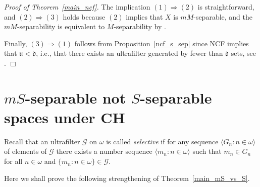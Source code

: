 \documentclass[12pt,a4paper]{amsart}
\theoremstyle{definition}
\newcommand{\w}{\omega}
\newcommand{\CG}{\mathcal{G}}
\newcommand{\la}{\langle}
\newcommand{\ra}{\rangle}
\newcommand{\hot}{\mathfrak}
\begin{document}
\noindent\textit{Proof of Theorem~\ref{main_ncf}.}
The implication 
$(1)\Rightarrow(2)$ is straightforward, and $(2)\Rightarrow (3)$ holds because $(2)$ implies that $X$ is $mM$-separable, and the $mM$-separability is equivalent
to $M$-separability by \cite[Lemma~2.1]{GruSak11}.

Finally,
$(3)\Rightarrow (1)$ follows from 
Proposition~\ref{ncf_s_sep} since NCF implies that $\hot u<\hot d$, i.e., that there exists an ultrafilter generated by fewer than $\hot d$ sets, see 
\cite[Theorem~14]{Bla86}.
\hfill $\Box$







\section{$mS$-separable  not $S$-separable spaces under CH}

Recall that an ultrafilter $\mathcal G$ on $\w$ is called 
\emph{selective} if for any sequence $\la G_n:n\in\w\ra$
of elements of $\CG$ there exists a number sequence
$\la m_n:n\in\w\ra$ such that $m_n\in G_n$ for all $n\in\w$
and $\{m_n:n\in\w\}\in\mathcal G$.

Here we shall prove the following strengthening of
Theorem~\ref{main_mS_vs_S}.
\end{document}
